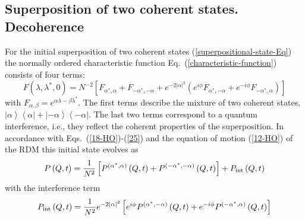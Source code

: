 \documentclass[12pt,twoside,a4paper]{report}
\begin{document}
\subsection{Superposition of two coherent states. Decoherence\label{quant-decoh}}
For the initial superposition of two coherent states (\ref{superpositional-state-Eq}) the
normally ordered characteristic function 
Eq.~(\ref{characteristic-function}) consists of four terms:
\begin{equation}
  F\left( \lambda ,\lambda ^{*},0\right) 
   =N^{-2}
         \left[ 
                F_{\alpha^{*},\alpha }
            +   F_{-\alpha ^{*},-\alpha }
            +   e^{-2\left| \alpha \right| ^2}
                     \left( 
                          e^{{{i}}\phi }F_{\alpha ^{*},-\alpha }
                       +  e^{-{{i}}\phi}F_{-\alpha ^{*},\alpha }
                     \right) 
         \right]
\label{30-HO}
\end{equation}
with $F_{\alpha ,\beta }=e^{ \alpha \lambda - \beta \lambda ^{*} }$. 
The first terms describe the mixture of two coherent states, 
$\left|    \alpha \right\rangle \left\langle   \alpha \right| 
+ \left|  - \alpha\right\rangle \left\langle  - \alpha \right| $. 
The last two terms correspond to a quantum interference, 
i.e., they reflect the coherent properties of the superposition.  
In accordance with Eqs.~(\ref{18-HO})-(\ref{25}) 
and the equation of motion  (\ref{12-HO}) of the RDM 
this initial state evolves as
\begin{equation}
P\left( Q,t\right) 
  =  \frac 1{N^2}
          \left[
              P^{\left( \alpha ^{*},\alpha \right) }\left( Q,t\right) 
          +   P^{\left(-\alpha ^{*},-\alpha \right) }\left( Q,t\right) 
          \right] 
     + P_{\rm int} \left( Q,t \right)
\label{HO-superposition-dynamics} 
\end{equation}
with the interference term
\begin{equation}
 P_{\rm int} \left( Q,t \right)
  =  \frac 1{N^2}
              e^{-2\left|\alpha \right| ^2}
                   \left[ 
                         e^{{{i}}\phi }
                         P^{\left(\alpha ^{*},-\alpha \right) }
                          \left( Q,t\right)
                      +  e^{-{{i}}\phi }
                         P^{\left( -\alpha^{*},\alpha \right) }
                          \left( Q,t\right)  
                   \right] 
\label{31-HO} 
\end{equation}
\end{document}
